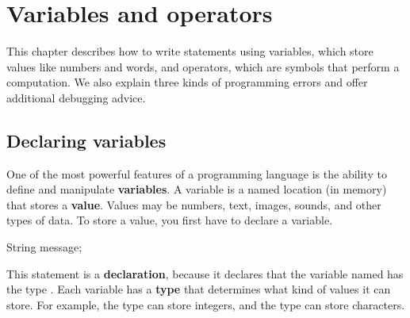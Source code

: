 \chapter{Variables and operators}

This chapter describes how to write statements using variables, which store values like numbers and words, and operators, which are symbols that perform a computation.
We also explain three kinds of programming errors and offer additional debugging advice.


\section{Declaring variables}



One of the most powerful features of a programming language is the ability to define and manipulate {\bf variables}.
A variable is a named location (in memory) that stores a {\bf value}.
Values may be numbers, text, images, sounds, and other types of data.
To store a value, you first have to declare a variable.

\begin{code}
String message;
\end{code}


This statement is a {\bf declaration}, because it declares that the variable named  has the type .
Each variable has a {\bf type} that determines what kind of values it can store.
For example, the  type can store integers, and the  type can store characters.

